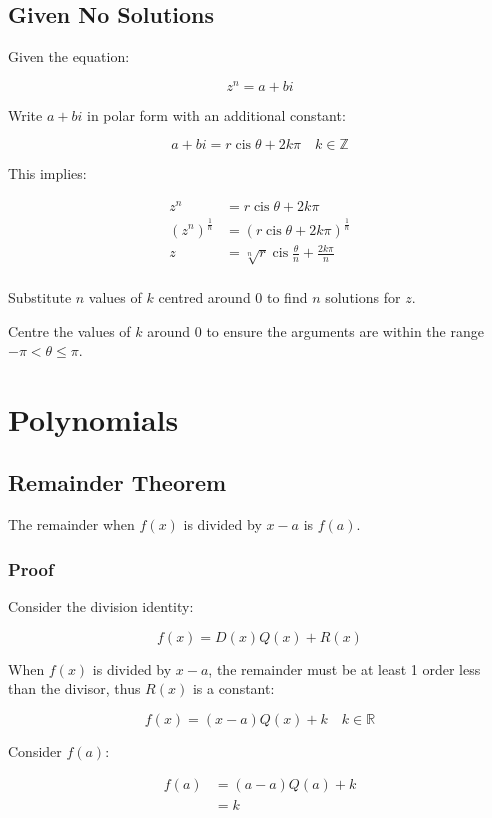 \documentclass[a4paper,11pt]{article}
\DeclareMathOperator\cis{cis}
\begin{document}
\subsection{Given No Solutions}

Given the equation:

$$
z^n = a + bi
$$

Write $a + bi$ in polar form with an additional constant:

$$
a + bi = r \cis{\theta + 2k\pi} \quad k \in \mathbb{Z}
$$

This implies:

$$
\begin{aligned}
z^n & = r \cis{\theta + 2k\pi} \\
(z^n)^{\frac{1}{n}} & = (r \cis{\theta + 2k\pi})^{\frac{1}{n}} \\
z & = \sqrt[n]{r} \cis{\frac{\theta}{n} + \frac{2k\pi}{n}} \\
\end{aligned}
$$

Substitute $n$ values of $k$ centred around 0 to find $n$ solutions for $z$.

Centre the values of $k$ around 0 to ensure the arguments are within the range
$-\pi < \theta \leq \pi$.




\section{Polynomials}

\subsection{Remainder Theorem}

The remainder when $f(x)$ is divided by $x - a$ is $f(a)$.


\subsubsection{Proof}

Consider the division identity:

$$
f(x) = D(x) Q(x) + R(x)
$$

When $f(x)$ is divided by $x - a$, the remainder must be at least 1 order less
than the divisor, thus $R(x)$ is a constant:

$$
f(x) = (x - a) Q(x) + k \quad k \in \mathbb{R}
$$

Consider $f(a)$:

$$
\begin{aligned}
f(a) & = (a - a) Q(a) + k \\
& = k \\
\end{aligned}
$$
\end{document}

